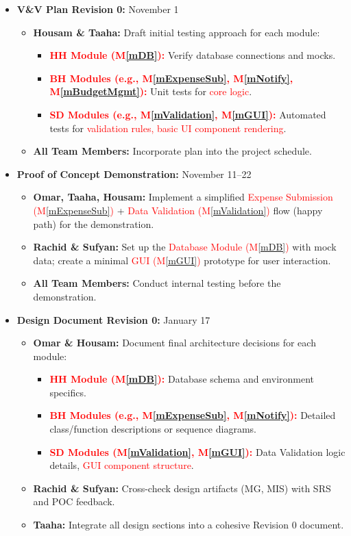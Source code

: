 \documentclass[12pt, titlepage]{article}
\newcommand{\mref}[1]{M\ref{#1}}
\begin{document}
\begin{itemize}
  \item \textbf{V\&V Plan Revision 0:} November 1
  \begin{itemize}
    \item \textbf{Housam \& Taaha:} Draft initial testing approach for each module:
    \begin{itemize}
      \item \textcolor{red}{\textbf{HH Module (\mref{mDB}):}} Verify database connections and mocks.
      \item \textcolor{red}{\textbf{BH Modules (e.g., \mref{mExpenseSub}, \mref{mNotify}, \mref{mBudgetMgmt}):}} Unit tests for \textcolor{red}{core logic}.
      \item \textcolor{red}{\textbf{SD Modules (e.g., \mref{mValidation}, \mref{mGUI}):}} Automated tests for \textcolor{red}{validation rules, basic UI component rendering}.
    \end{itemize}
    \item \textbf{All Team Members:} Incorporate plan into the project schedule.
  \end{itemize}

  \item \textbf{Proof of Concept Demonstration:} November 11--22
  \begin{itemize}
    \item \textbf{Omar, Taaha, Housam:} Implement a simplified \textcolor{red}{Expense Submission (\mref{mExpenseSub})} + \textcolor{red}{Data Validation (\mref{mValidation})} flow (happy path) for the demonstration.
    \item \textbf{Rachid \& Sufyan:} Set up the \textcolor{red}{Database Module (\mref{mDB})} with mock data; create a minimal \textcolor{red}{GUI (\mref{mGUI})} prototype for user interaction.
    \item \textbf{All Team Members:} Conduct internal testing before the demonstration.
  \end{itemize}

  \item \textbf{Design Document Revision 0:} January 17
  \begin{itemize}
    \item \textbf{Omar \& Housam:} Document final architecture decisions for each module:
    \begin{itemize}
      \item \textcolor{red}{\textbf{HH Module (\mref{mDB}):}} Database schema and environment specifics.
      \item \textcolor{red}{\textbf{BH Modules (e.g., \mref{mExpenseSub}, \mref{mNotify}):}} Detailed class/function descriptions or sequence diagrams.
      \item \textcolor{red}{\textbf{SD Modules (\mref{mValidation}, \mref{mGUI}):}} Data Validation logic details, \textcolor{red}{GUI component structure}.
    \end{itemize}
    \item \textbf{Rachid \& Sufyan:} Cross-check design artifacts (MG, MIS) with SRS and POC feedback.
    \item \textbf{Taaha:} Integrate all design sections into a cohesive Revision 0 document.
  \end{itemize}


\end{itemize}
\end{document}
